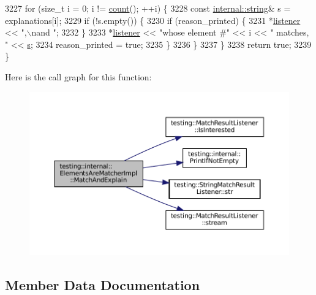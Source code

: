 \begin{DoxyCode}
3227       \textcolor{keywordflow}{for} (\textcolor{keywordtype}{size\_t} i = 0; i != \hyperlink{classtesting_1_1internal_1_1ElementsAreMatcherImpl_a8a8cf605a9fdc0eb8855fe9ce1aafb1e}{count}(); ++i) \{
3228         \textcolor{keyword}{const} \hyperlink{namespacetesting_1_1internal_a8e8ff5b11e64078831112677156cb111}{internal::string}& s = explanations[i];
3229         \textcolor{keywordflow}{if} (!s.empty()) \{
3230           \textcolor{keywordflow}{if} (reason\_printed) \{
3231             *\hyperlink{namespaceinteractive__marker_a0e579ab555212bb5e2c9f8a675b7618a}{listener} << \textcolor{stringliteral}{",\(\backslash\)nand "};
3232           \}
3233           *\hyperlink{namespaceinteractive__marker_a0e579ab555212bb5e2c9f8a675b7618a}{listener} << \textcolor{stringliteral}{"whose element #"} << i << \textcolor{stringliteral}{" matches, "} << \hyperlink{namespaceservice__node__3_aa976421a49e0b54f23833423400849ae}{s};
3234           reason\_printed = \textcolor{keyword}{true};
3235         \}
3236       \}
3237     \}
3238     \textcolor{keywordflow}{return} \textcolor{keyword}{true};
3239   \}
\end{DoxyCode}
Here is the call graph for this function\+:
\nopagebreak
\begin{figure}[H]
\begin{center}
\leavevmode
\includegraphics[width=350pt]{classtesting_1_1internal_1_1ElementsAreMatcherImpl_a6562159fa83e09417c3552fd881f878e_cgraph}
\end{center}
\end{figure}


\subsection{Member Data Documentation}
\mbox{\label{classtesting_1_1internal_1_1ElementsAreMatcherImpl_aefcf41a7cfe74274c68272a67fb94e9f}} 
